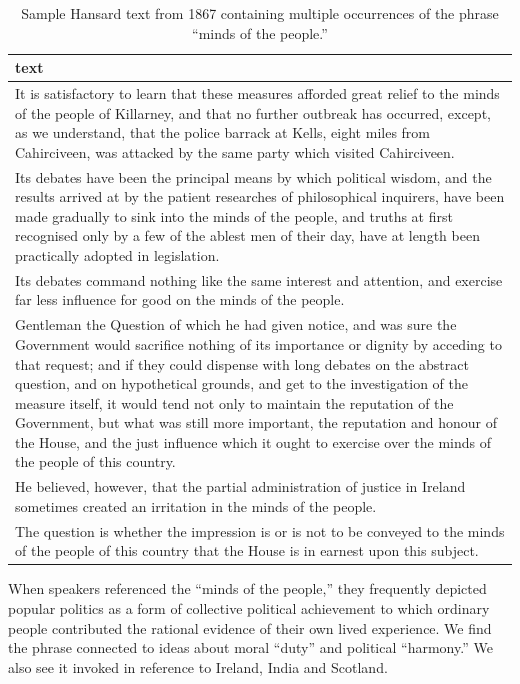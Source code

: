 \documentclass[
]{article}
\begin{document}
\begin{longtable}[t]{>{\raggedright\arraybackslash}p{14cm}}
\caption{\label{tab:unnamed-chunk-20}Sample Hansard text from 1867 containing multiple 
        occurrences of the phrase “minds of the people.”}\\
\toprule
text\\
\midrule
It is satisfactory to learn that these measures afforded great relief to the
minds of the people of Killarney, and that no further outbreak has occurred,
except, as we understand, that the police barrack at Kells, eight miles from
Cahirciveen, was attacked by the same party which visited Cahirciveen.\\
Its debates have been the principal means by which political wisdom, and the
results arrived at by the patient researches of philosophical inquirers, have
been made gradually to sink into the minds of the people, and truths at first
recognised only by a few of the ablest men of their day, have at length been
practically adopted in legislation.\\
Its debates command nothing like the same interest and attention, and exercise
far less influence for good on the minds of the people.\\
Gentleman the Question of which he had given notice, and was sure the Government
would sacrifice nothing of its importance or dignity by acceding to that
request; and if they could dispense with long debates on the abstract question,
and on hypothetical grounds, and get to the investigation of the measure itself,
it would tend not only to maintain the reputation of the Government, but what
was still more important, the reputation and honour of the House, and the
just influence which it ought to exercise over the minds of the people of this
country.\\
He believed, however, that the partial administration of justice in Ireland
sometimes created an irritation in the minds of the people.\\
\addlinespace
The question is whether the impression is or is not to be conveyed to the minds
of the people of this country that the House is in earnest upon this subject.\\
\bottomrule
\end{longtable}

When speakers referenced the ``minds of the people,'' they frequently
depicted popular politics as a form of collective political achievement
to which ordinary people contributed the rational evidence of their own
lived experience. We find the phrase connected to ideas about moral
``duty'' and political ``harmony.'' We also see it invoked in reference
to Ireland, India and Scotland.
\end{document}
